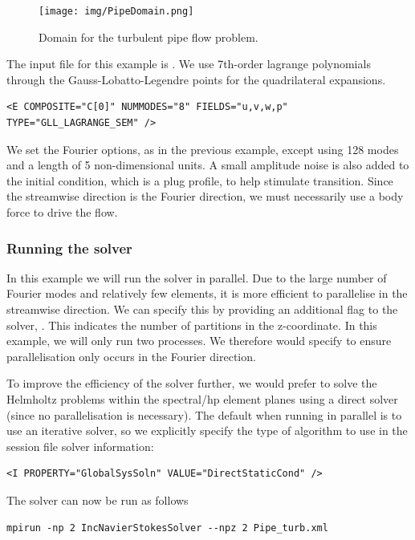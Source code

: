 \begin{figure}
\begin{center}
\texttt{[image: img/PipeDomain.png]}
\caption{Domain for the turbulent pipe flow problem.}
\label{f:incns:turbpipemesh}
\end{center}
\end{figure}

The input file for this example is . We use 7th-order
lagrange polynomials through the Gauss-Lobatto-Legendre points for the
quadrilateral expansions.
\begin{lstlisting}[style=XMLStyle]
<E COMPOSITE="C[0]" NUMMODES="8" FIELDS="u,v,w,p" TYPE="GLL_LAGRANGE_SEM" />
\end{lstlisting}
We set the Fourier options, as in the previous example, except using 128
modes and a length of 5 non-dimensional units. A small amplitude noise is also
added to the initial condition, which is a plug profile, to help stimulate
transition. Since the streamwise direction is the Fourier direction, we must
necessarily use a body force to drive the flow.

\subsubsection{Running the solver}
In this example we will run the solver in parallel. Due to the large number of
Fourier modes and relatively few elements, it is more efficient to parallelise
in the streamwise direction. We can specify this by providing an additional flag
to the solver, . This indicates the number of partitions in the
z-coordinate. In this example, we will only run two processes. We therefore
would specify  to ensure parallelisation only occurs in the
Fourier direction.

To improve the efficiency of the solver further, we would prefer to solve
the Helmholtz problems within the spectral/hp element planes using a
direct solver (since no parallelisation is necessary). The default when
running in parallel is to use an iterative solver, so we explicitly
specify the type of algorithm to use in the session file solver
information:
\begin{lstlisting}[style=XMLStyle]
<I PROPERTY="GlobalSysSoln" VALUE="DirectStaticCond" />
\end{lstlisting}

The solver can now be run as follows
\begin{lstlisting}[style=BashInputStyle]
mpirun -np 2 IncNavierStokesSolver --npz 2 Pipe_turb.xml
\end{lstlisting}


